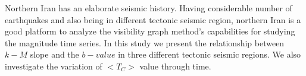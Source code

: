 \noindent
Northern Iran has an elaborate seismic history.  Having considerable number of earthquakes and also being in different tectonic seismic region, northern Iran is a good platform to analyze the visibility graph method's capabilities for studying the magnitude time series. In this study we present the relationship between $k-M$ slope and the $b-value$ in three different tectonic seismic regions. We also investigate the variation of $<T_C>$ value through time.






